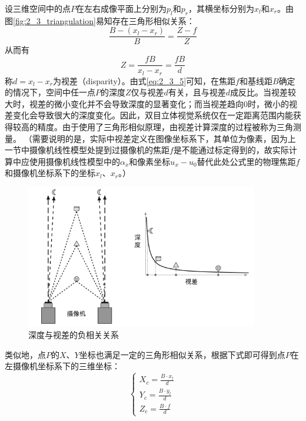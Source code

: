 设三维空间中的点$P$在左右成像平面上分别为$p_l$和$p_r$，其横坐标分别为$x_l$和$x_r$。由图\ref{fig:2_3_triangulation}易知存在三角形相似关系：
%
\begin{equation}\label{eq:2_3_4}
\frac{B - (x_l - x_r)}{B} = \frac{Z-f}{Z}
\end{equation}
从而有
\begin{equation}\label{eq:2_3_5}
Z = \frac{fB}{x_l - x_r} = \frac{fB}{d}
\end{equation}
称$d=x_l - x_r$为视差（disparity）。由式\ref{eq:2_3_5}可知，在焦距$f$和基线距$B$确定的情况下，空间中任一点$P$的深度$Z$仅与视差$d$有关，且与视差$d$成反比。当视差较大时，视差的微小变化并不会导致深度的显著变化；而当视差趋向0时，微小的视差变化会导致很大的深度变化。因此，双目立体视觉系统仅在一定距离范围内能获得较高的精度。由于使用了三角形相似原理，由视差计算深度的过程被称为三角测量。
（需要说明的是，实际中视差定义在图像坐标系下，其单位为像素，因为上一节中摄像机线性模型处提到过摄像机的焦距$f$是不能通过标定得到的，故实际计算中应使用摄像机线性模型中的$\alpha_x$和像素坐标$u_x-u_0$替代此处公式里的物理焦距$f$和摄像机坐标系下的坐标$x_l$、$x_r$。）


\begin{figure}[!htb] %
	\centering
	\includegraphics[width=4in]{figures/2_3_depth_vs_disparity}
	\caption{深度与视差的负相关关系}\label{fig:2_3_depth_vs_disparity}
\end{figure}

类似地，点$P$的$X$、$Y$坐标也满足一定的三角形相似关系，根据下式即可得到点$P$在左摄像机坐标系下的三维坐标：
%
\begin{equation}\label{eq:2_3_6}
\begin{cases}
X_c = \frac{B\cdot x_l }{d} \\
Y_c = \frac{B\cdot y_l }{d} \\
Z_c = \frac{B\cdot f}{d}
\end{cases}
\end{equation}


